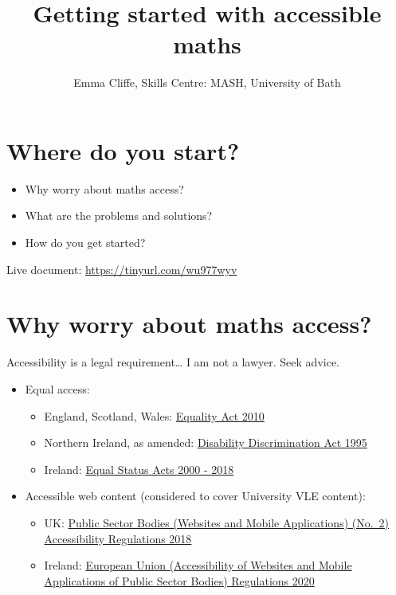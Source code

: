 \documentclass[
  12pt,
  a4paper]{extarticle}
\title{Getting started with accessible maths}
\author{Emma Cliffe, Skills Centre: MASH, University of Bath}
\date{}
\providecommand{\tightlist}{%
  \setlength{\itemsep}{0pt}\setlength{\parskip}{0pt}}
\theoremstyle{plain}
\theoremstyle{plain}
\theoremstyle{plain}
\theoremstyle{plain}
\theoremstyle{plain}
\theoremstyle{definition}
\theoremstyle{definition}
\theoremstyle{definition}
\theoremstyle{remark}
\renewcommand{\;}{\,}
\begin{document}
\maketitle

{
\setcounter{tocdepth}{2}
\tableofcontents
}
\newpage
{}

\hypertarget{where-do-you-start}{%
\section*{Where do you start?}\label{where-do-you-start}}

\begin{itemize}
\tightlist
\item
  Why worry about maths access?
\item
  What are the problems and solutions?
\item
  How do you get started?
\end{itemize}

Live document: \url{https://tinyurl.com/wu977wyv}

\hypertarget{why-worry-about-maths-access}{%
\section{Why worry about maths access?}\label{why-worry-about-maths-access}}

Accessibility is a legal requirement\ldots{} I am not a lawyer. Seek advice.

\begin{itemize}
\tightlist
\item
  Equal access:

  \begin{itemize}
  \tightlist
  \item
    England, Scotland, Wales: \href{https://www.legislation.gov.uk/ukpga/2010/15/contents}{Equality Act 2010}
  \item
    Northern Ireland, as amended: \href{http://www.niassembly.gov.uk/globalassets/Documents/RaISe/Publications/2012/ofmdfm/2712.pdf}{Disability Discrimination Act 1995}
  \item
    Ireland: \href{https://www.ihrec.ie/guides-and-tools/human-rights-and-equality-in-the-provision-of-good-and-services/what-does-the-law-say/equal-status-acts/}{Equal Status Acts 2000 - 2018}
  \end{itemize}
\item
  Accessible web content (considered to cover University VLE content):

  \begin{itemize}
  \tightlist
  \item
    UK: \href{https://www.legislation.gov.uk/uksi/2018/852/contents/made}{Public Sector Bodies (Websites and Mobile Applications) (No.~2) Accessibility Regulations 2018}
  \item
    Ireland: \href{https://www.irishstatutebook.ie/eli/2020/si/358/made/en/print}{European Union (Accessibility of Websites and Mobile Applications of Public Sector Bodies) Regulations 2020}
  \end{itemize}
\end{itemize}
\end{document}
